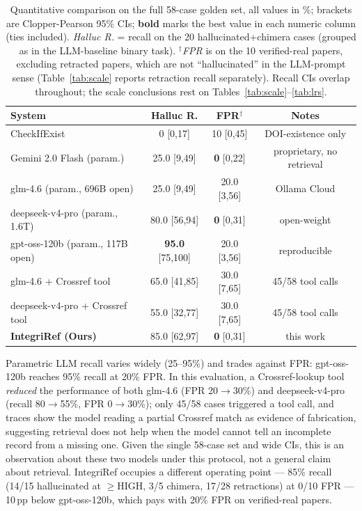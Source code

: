 \documentclass[runningheads]{llncs}
\begin{document}
\begin{table}[!tb]
\centering
\small
\setlength{\tabcolsep}{3pt}
\begin{tabular}{@{}lccc@{}}
\toprule
\textbf{System} & \textbf{Halluc R.} & \textbf{FPR$^{\dagger}$} & \textbf{Notes} \\
\midrule
CheckIfExist~\cite{abbonato2026checkifexist} & 0 \footnotesize{[0,17]} & 10 \footnotesize{[0,45]} & DOI-existence only \\
Gemini 2.0 Flash (param.) & 25.0 \footnotesize{[9,49]} & \textbf{0} \footnotesize{[0,22]} & proprietary, no retrieval \\
glm-4.6 (param., 696B open) & 25.0 \footnotesize{[9,49]} & 20.0 \footnotesize{[3,56]} & Ollama Cloud \\
deepseek-v4-pro (param., 1.6T) & 80.0 \footnotesize{[56,94]} & \textbf{0} \footnotesize{[0,31]} & open-weight \\
gpt-oss-120b (param., 117B open) & \textbf{95.0} \footnotesize{[75,100]} & 20.0 \footnotesize{[3,56]} & reproducible \\
glm-4.6 + Crossref tool & 65.0 \footnotesize{[41,85]} & 30.0 \footnotesize{[7,65]} & 45/58 tool calls \\
deepseek-v4-pro + Crossref tool & 55.0 \footnotesize{[32,77]} & 30.0 \footnotesize{[7,65]} & 45/58 tool calls \\
\midrule
\textbf{IntegriRef (Ours)} & 85.0 \footnotesize{[62,97]} & \textbf{0} \footnotesize{[0,31]} & this work \\
\bottomrule
\end{tabular}
\caption{Quantitative comparison on the full 58-case golden set, all values in \%; brackets are Clopper-Pearson 95\% CIs; \textbf{bold} marks the best value in each numeric column (ties included). \emph{Halluc R.} = recall on the 20 hallucinated+chimera cases (grouped as in the LLM-baseline binary task). $^{\dagger}$\emph{FPR} is on the 10 verified-real papers, excluding retracted papers, which are not ``hallucinated'' in the LLM-prompt sense (Table~\ref{tab:scale} reports retraction recall separately). Recall CIs overlap throughout; the scale conclusions rest on Tables~\ref{tab:scale}--\ref{tab:lrs}.}
\label{tab:results}
\end{table}

Parametric LLM recall varies widely (25--95\%) and trades against FPR: gpt-oss-120b reaches 95\% recall at 20\% FPR. In this evaluation, a Crossref-lookup tool \emph{reduced} the performance of both glm-4.6 (FPR 20$\to$30\%) and deepseek-v4-pro (recall 80$\to$55\%, FPR 0$\to$30\%); only 45/58 cases triggered a tool call, and traces show the model reading a partial Crossref match as evidence of fabrication, suggesting retrieval does not help when the model cannot tell an incomplete record from a missing one. Given the single 58-case set and wide CIs, this is an observation about these two models under this protocol, not a general claim about retrieval. IntegriRef occupies a different operating point --- 85\% recall (14/15 hallucinated at $\geq$HIGH, 3/5 chimera, 17/28 retractions) at 0/10 FPR --- 10\,pp below gpt-oss-120b, which pays with 20\% FPR on verified-real papers.
\end{document}
